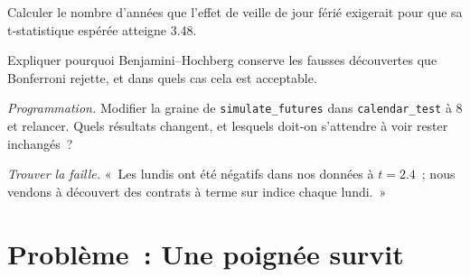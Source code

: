 \begin{exercise}[$\star\star$]\label{exo:s1:seasonality-and-calendar-effects:5}
Calculer le nombre d'années que l'effet de veille de jour férié exigerait pour que sa t-statistique espérée atteigne 3.48.
\end{exercise}

\begin{exercise}[$\star\star$]\label{exo:s1:seasonality-and-calendar-effects:6}
Expliquer pourquoi Benjamini--Hochberg conserve les fausses découvertes que Bonferroni rejette, et dans quels cas cela est acceptable.
\end{exercise}

\begin{exercise}[$\star\star\star$]\label{exo:s1:seasonality-and-calendar-effects:7}
\emph{Programmation.} Modifier la graine de \texttt{simulate\_futures} dans \texttt{calendar\_test} à 8 et relancer. Quels résultats changent, et
lesquels doit-on s'attendre à voir rester inchangés~?
\end{exercise}

\begin{exercise}[$\star\star\star$]\label{exo:s1:seasonality-and-calendar-effects:8}
\emph{Trouver la faille.} «~Les lundis ont été négatifs dans nos données à $t = 2.4$~; nous vendons à découvert des contrats à terme sur indice chaque lundi.~»
\end{exercise}

\section{Problème~: Une poignée survit}

